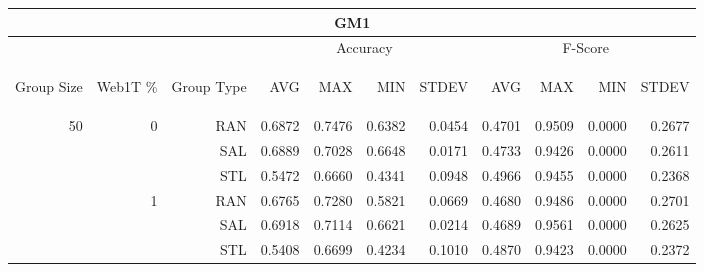 \begin{center}
\begin{table}[htbp]
\begin{tabular}{ | r | r | r | r | r | r | r | r | r | r | r |}
\hline
\multicolumn{11}{|c|}{GM1}\\
\hline
 & & & \multicolumn{4}{|c|}{Accuracy} & \multicolumn{4}{|c|}{F-Score}\\ \cline{4-11}
\begin{sideways}Group Size\end{sideways} & \begin{sideways}Web1T \%\end{sideways} & \begin{sideways}Group Type\end{sideways} & \begin{sideways}AVG\end{sideways} & \begin{sideways}MAX\end{sideways} & \begin{sideways}MIN\end{sideways} & \begin{sideways}STDEV\end{sideways} & \begin{sideways}AVG\end{sideways} & \begin{sideways}MAX\end{sideways} & \begin{sideways}MIN\end{sideways} & \begin{sideways}STDEV\end{sideways}\\
\hline
\multirow{18}{*}{50}
 & \multirow{3}{*}{0} & RAN & 0.6872 & 0.7476 & 0.6382 & 0.0454 & 0.4701 & 0.9509 & 0.0000 & 0.2677\\ \cline{3-11}
 &   & SAL & 0.6889 & 0.7028 & 0.6648 & 0.0171 & 0.4733 & 0.9426 & 0.0000 & 0.2611\\ \cline{3-11}
 &   & STL & 0.5472 & 0.6660 & 0.4341 & 0.0948 & 0.4966 & 0.9455 & 0.0000 & 0.2368\\ \cline{2-11}
 & \multirow{3}{*}{1} & RAN & 0.6765 & 0.7280 & 0.5821 & 0.0669 & 0.4680 & 0.9486 & 0.0000 & 0.2701\\ \cline{3-11}
 &   & SAL & 0.6918 & 0.7114 & 0.6621 & 0.0214 & 0.4689 & 0.9561 & 0.0000 & 0.2625\\ \cline{3-11}
 &   & STL & 0.5408 & 0.6699 & 0.4234 & 0.1010 & 0.4870 & 0.9423 & 0.0000 & 0.2372\\ \cline{2-11}

\end{tabular}
\end{table}
\end{center}
